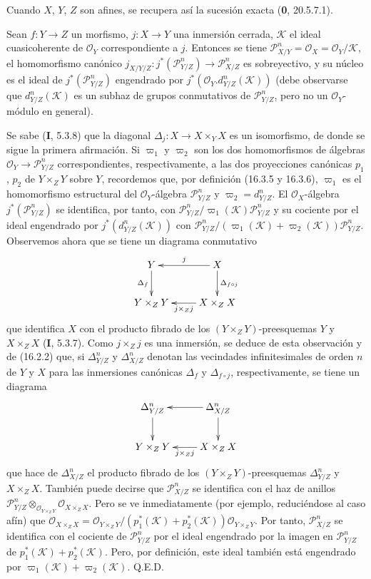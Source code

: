 Cuando $X$, $Y$, $Z$ son afines, se recupera así la sucesión exacta
(\textbf 0, 20.5.7.1).

\begin{proposition}[16.4.20]
\label{IV.16.4.20}
Sean $f:Y\to Z$ un morfismo, $j:X\to Y$ una inmersión cerrada,
$\mathscr{K}$ el ideal cuasicoherente de $\mathcal{O}_Y$ correspondiente a $j$.
Entonces se tiene
$\mathscr{P}_{X/Y}^n=\mathcal{O}_X=\mathcal{O}_Y/\mathscr{K}$,
el homomorfismo canónico
$j_{X/Y/Z}:j^*(\mathscr{P}_{Y/Z}^n)\to\mathscr{P}_{X/Z}^n$ es sobreyectivo, y
su núcleo es el ideal de $j^*(\mathscr{P}_{Y/Z}^n)$ engendrado por
$j^*(\mathcal{O}_Y.d_{Y/Z}^n(\mathscr{K}))$ (debe observarse que
$d_{Y/Z}^n(\mathscr{K})$ es un subhaz de grupos conmutativos de
$\mathscr{P}_{Y/Z}^n$, pero no un $\mathcal{O}_Y$-módulo en general).
\end{proposition}

Se sabe (\textbf I, 5.3.8) que la diagonal
$\Delta_j:X\to X\times_Y X$ es un isomorfismo, de donde se sigue la primera afirmación.
Si $\varpi_1$ y $\varpi_2$ son los dos homomorfismos de álgebras
$\mathcal{O}_Y\to\mathscr{P}_{Y/Z}^n$ correspondientes, respectivamente, a las dos
proyecciones canónicas $p_1$, $p_2$ de $Y\times_Z Y$ sobre $Y$, recordemos que,
por definición (16.3.5 y 16.3.6), $\varpi_1$ es el homomorfismo estructural del
$\mathcal{O}_Y$-álgebra $\mathscr{P}_{Y/Z}^n$ y
$\varpi_2=d_{Y/Z}^n$. El $\mathcal{O}_X$-álgebra
$j^*(\mathscr{P}_{Y/Z}^n)$ se identifica, por tanto, con
$\mathscr{P}_{Y/Z}^n/\varpi_1(\mathscr{K})\mathscr{P}_{Y/Z}^n$ y su cociente
por el ideal engendrado por $j^*(d_{Y/Z}^n(\mathscr{K}))$ con
$\mathscr{P}_{Y/Z}^n/(\varpi_1(\mathscr{K})+\varpi_2(\mathscr{K}))\mathscr{P}_{Y/Z}^n$.
Observemos ahora que se tiene un diagrama conmutativo
\[
  \xymatrix{
    Y\ar[d]_-{\Delta_f}&X\ar[l]_-j\ar[d]^-{\Delta_{f\circ j}}\\
    Y\times_Z Y&X\times_Z X\ar[l]^-{j\times_Z j}
  }
\]
que identifica $X$ con el producto fibrado de los $(Y\times_Z Y)$-preesquemas $Y$ y
$X\times_Z X$ (\textbf I, 5.3.7). Como $j\times_Z j$ es una inmersión, se deduce
de esta observación y de (16.2.2) que, si $\Delta_{Y/Z}^n$ y
$\Delta_{X/Z}^n$ denotan las vecindades infinitesimales de orden $n$ de $Y$
y $X$ para las inmersiones canónicas $\Delta_f$ y $\Delta_{f\circ j}$,
respectivamente, se tiene un diagrama
\[
  \xymatrix{
    \Delta_{Y/Z}^n\ar[d]&\Delta_{X/Z}^n\ar[l]\ar[d]\\
    Y\times_Z Y&X\times_Z X\ar[l]^-{j\times_Z j}
  }
\]
que hace de $\Delta_{X/Z}^n$ el producto fibrado de los $(Y\times_Z Y)$-preesquemas
$\Delta_{Y/Z}^n$ y $X\times_Z X$. También puede decirse que
$\mathscr{P}_{X/Z}^n$ se identifica con el haz de anillos
$\mathscr{P}_{Y/Z}^n\otimes_{\mathcal{O}_{Y\times_Z Y}}
\mathcal{O}_{X\times_Z X}$. Pero se ve inmediatamente (por ejemplo, reduciéndose
al caso afín) que
$\mathcal{O}_{X\times_Z X}=\mathcal{O}_{Y\times_Z Y}/(p_1^*(\mathscr{K})+p_2^*(\mathscr{K}))\mathcal{O}_{Y\times_Z Y}$.
Por tanto, $\mathscr{P}_{X/Z}^n$ se identifica con el cociente de
$\mathscr{P}_{Y/Z}^n$ por el ideal engendrado por la imagen en
$\mathscr{P}_{Y/Z}^n$ de $p_1^*(\mathscr{K})+p_2^*(\mathscr{K})$. Pero, por
definición, este ideal también está engendrado por
$\varpi_1(\mathscr{K})+\varpi_2(\mathscr{K})$. Q.E.D.

